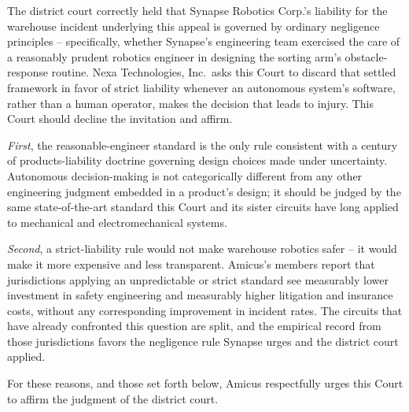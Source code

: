 

The district court correctly held that Synapse Robotics Corp.'s liability for the warehouse incident underlying this appeal is governed by ordinary negligence principles -- specifically, whether Synapse's engineering team exercised the care of a reasonably prudent robotics engineer in designing the sorting arm's obstacle-response routine. Nexa Technologies, Inc.\ asks this Court to discard that settled framework in favor of strict liability whenever an autonomous system's software, rather than a human operator, makes the decision that leads to injury. This Court should decline the invitation and affirm.

\emph{First}, the reasonable-engineer standard is the only rule consistent with a century of products-liability doctrine governing design choices made under uncertainty. Autonomous decision-making is not categorically different from any other engineering judgment embedded in a product's design; it should be judged by the same state-of-the-art standard this Court and its sister circuits have long applied to mechanical and electromechanical systems.

\emph{Second}, a strict-liability rule would not make warehouse robotics safer -- it would make it more expensive and less transparent. Amicus's members report that jurisdictions applying an unpredictable or strict standard see measurably lower investment in safety engineering and measurably higher litigation and insurance costs, without any corresponding improvement in incident rates. The circuits that have already confronted this question are split, and the empirical record from those jurisdictions favors the negligence rule Synapse urges and the district court applied.

For these reasons, and those set forth below, Amicus respectfully urges this Court to affirm the judgment of the district court.

\bigskip
